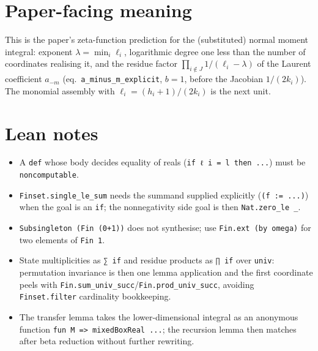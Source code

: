 \documentclass[11pt]{article}
\begin{document}
\section{Paper-facing meaning}
This is the paper's zeta-function prediction for the (substituted) normal moment integral:
exponent $\lambda=\min_i\ell_i$, logarithmic degree one less than the number of coordinates
realising it, and the residue factor $\prod_{i\notin J}1/(\ell_i-\lambda)$ of the Laurent coefficient
$a_{-m}$ (eq.~\texttt{a\_minus\_m\_explicit}, $b=1$, before the Jacobian $1/(2k_i)$). The monomial
assembly with $\ell_i=(h_i+1)/(2k_i)$ is the next unit.

\section{Lean notes}
\begin{itemize}
\item A \texttt{def} whose body decides equality of reals (\texttt{if ℓ i = l then ...}) must be
\texttt{noncomputable}.
\item \texttt{Finset.single\_le\_sum} needs the summand supplied explicitly (\texttt{(f := ...)}) when
the goal is an \texttt{if}; the nonnegativity side goal is then \texttt{Nat.zero\_le \_}.
\item \texttt{Subsingleton (Fin (0+1))} does not synthesise; use
\texttt{Fin.ext (by omega)} for two elements of \texttt{Fin 1}.
\item State multiplicities as \texttt{∑ if} and residue products as \texttt{∏ if} over
\texttt{univ}: permutation invariance is then one lemma application and the first coordinate peels
with \texttt{Fin.sum\_univ\_succ}/\texttt{Fin.prod\_univ\_succ}, avoiding \texttt{Finset.filter}
cardinality bookkeeping.
\item The transfer lemma takes the lower-dimensional integral as an anonymous function
\texttt{fun M => mixedBoxReal ...}; the recursion lemma then matches after beta reduction without
further rewriting.
\end{itemize}
\end{document}
